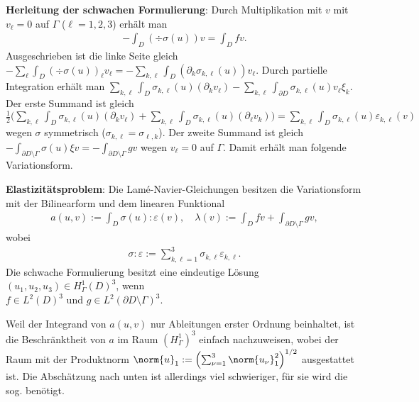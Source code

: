 \textbf{Herleitung der schwachen Formulierung}:
Durch Multiplikation mit $v$ mit $v_\ell = 0$ auf $\Gamma$ ($\ell = 1, 2, 3$) erhält man
\begin{align*}
    -\int_D (\div \sigma(u)) v = \int_D fv.
\end{align*}
Ausgeschrieben ist die linke Seite gleich
$-\sum_\ell \int_D (\div \sigma(u))_\ell v_\ell
= -\sum_{k,\ell} \int_D (\partial_k \sigma_{k,\ell}(u)) v_\ell$.
Durch partielle Integration erhält man
$\sum_{k,\ell} \int_D \sigma_{k,\ell}(u) (\partial_k v_\ell)
- \sum_{k,\ell} \int_{\partial D} \sigma_{k,\ell}(u) v_\ell \xi_k$.
Der erste Summand ist gleich
$\frac{1}{2}
\big(\sum_{k,\ell} \int_D \sigma_{k,\ell}(u) (\partial_k v_\ell) +
\sum_{k,\ell} \int_D \sigma_{k,\ell}(u) (\partial_\ell v_k)\big)
= \sum_{k,\ell} \int_D \sigma_{k,\ell}(u) \varepsilon_{k,\ell}(v)$
wegen $\sigma$ symmetrisch ($\sigma_{k,\ell} = \sigma_{\ell,k}$).
Der zweite Summand ist gleich
$-\int_{\partial D \setminus \Gamma} \sigma(u) \xi v =
-\int_{\partial D \setminus \Gamma} gv$ wegen $v_\ell = 0$ auf $\Gamma$.
Damit erhält man folgende Variationsform.

\linie

\textbf{Elastizitätsproblem}:
Die Lamé-Navier-Gleichungen besitzen die Variationsform mit der
Bilinearform und dem linearen Funktional
\begin{align*}
    a(u, v) := \int_D \sigma(u):\varepsilon(v),\quad
    \lambda(v) := \int_D fv + \int_{\partial D \setminus \Gamma} gv,
\end{align*}
wobei
\begin{align*}
    \sigma:\varepsilon := \sum_{k,\ell=1}^3 \sigma_{k,\ell} \varepsilon_{k,\ell}.
\end{align*}
Die schwache Formulierung besitzt eine eindeutige Lösung $(u_1, u_2, u_3) \in H_\Gamma^1(D)^3$,
wenn\\
$f \in L^2(D)^3$ und $g \in L^2(\partial D \setminus \Gamma)^3$.

\linie
\pagebreak

Weil der Integrand von $a(u, v)$ nur Ableitungen erster Ordnung beinhaltet,
ist die Beschränktheit von $a$ im Raum $(H_\Gamma^1)^3$ einfach nachzuweisen,
wobei der Raum mit der Produktnorm
$\norm{u}_1 := \left(\sum_{\nu=1}^3 \norm{u_\nu}_1^2\right)^{1/2}$ ausgestattet ist.
Die Abschätzung nach unten ist allerdings viel schwieriger,
für sie wird die sog.  benötigt.

\linie

